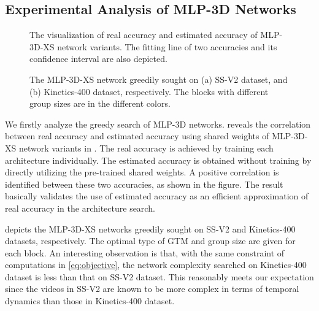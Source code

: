 \documentclass[10pt,twocolumn,letterpaper]{article}
\begin{document}
\subsection{Experimental Analysis of MLP-3D Networks}

\begin{figure}[!tb]
   \vspace{-0.1in}
   \caption{\small The visualization of real accuracy and estimated accuracy of MLP-3D-XS network variants. The fitting line of two accuracies and its confidence interval are also depicted.}
   \label{fig:relation}
   \vspace{-0.1in}
\end{figure}

\begin{figure}
\centering
    \vspace{-0.1in}
   \caption{\small The MLP-3D-XS network greedily sought on (a) SS-V2 dataset, and (b) Kinetics-400 dataset, respectively. The blocks with different group sizes are in the different colors. }
   \label{fig:network}
   \vspace{-0.20in}
\end{figure}

We firstly analyze the greedy search of MLP-3D networks.  reveals the correlation between real accuracy and estimated accuracy using shared weights of MLP-3D-XS network variants in . The real accuracy is achieved by training each architecture individually. The estimated accuracy is obtained without training by directly utilizing the pre-trained shared weights. A positive correlation is identified between these two accuracies, as shown in the figure. The result basically validates the use of estimated accuracy as an efficient approximation of real accuracy in the architecture search.

 depicts the MLP-3D-XS networks greedily sought on SS-V2 and Kinetics-400 datasets, respectively. The optimal type of GTM and group size are given for each block. An interesting observation is that, with the same constraint of computations in \cref{eq:objective}, the network complexity searched on Kinetics-400 dataset is less than that on SS-V2 dataset. This reasonably meets our expectation since the videos in SS-V2 are known to be more complex in terms of temporal dynamics than those in Kinetics-400 dataset.
\end{document}
